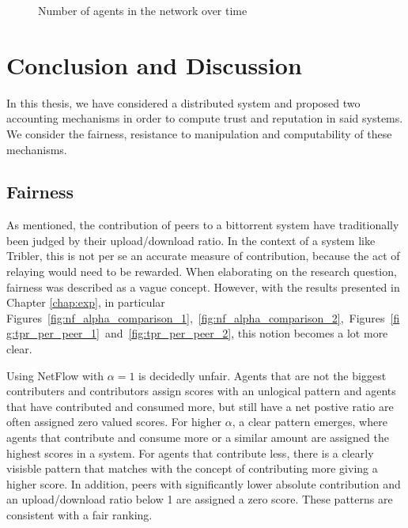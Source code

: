 \documentclass[a4paper,11pt]{book}
\theoremstyle{definition}
\begin{document}
\begin{figure}[ht]
    \centering
    
    \caption{Number of agents in the network over time}
    \label{fig:evolution}
\end{figure}








\chapter{Conclusion and Discussion}

In this thesis, we have considered a distributed system and proposed two accounting mechanisms
in order to compute trust and reputation in said systems. We consider the fairness, resistance
to manipulation and computability of these mechanisms.

\section{Fairness}

As mentioned, the contribution of peers to a bittorrent system have traditionally been judged by their
upload/download ratio. In the context of a system like Tribler, this is not per se an accurate
measure of contribution, because the act of relaying would need to be rewarded. When elaborating on
the research question, fairness was described as a vague concept. However, with the results
presented in Chapter \ref{chap:exp}, in particular 
Figures~\ref{fig:nf_alpha_comparison_1},~\ref{fig:nf_alpha_comparison_2},~Figures~\ref{fig:tpr_per_peer_1}~and~\ref{fig:tpr_per_peer_2},
this notion becomes a lot more clear. 

Using NetFlow with $\alpha=1$ is decidedly unfair. 
Agents that are not the biggest contributers and contributors assign scores with an unlogical pattern and
agents that have contributed and consumed more, but still have a net postive ratio are often assigned
zero valued scores. For higher $\alpha$, a clear pattern emerges, where agents that contribute
and consume more or a similar amount are assigned the highest scores in a system. For agents
that contribute less, there is a clearly visisble pattern that matches with the concept of 
contributing more giving a higher score. In addition, peers with significantly lower absolute contribution
and an upload/download ratio below 1 are assigned a zero score. These patterns are consistent with a fair
ranking.
\end{document}
